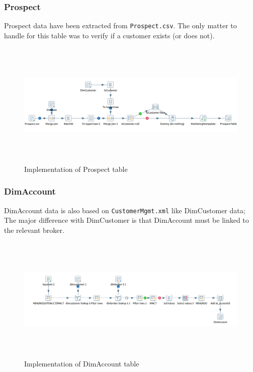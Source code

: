 \documentclass{article}
\newcommand\pcw[1]{\texttt{#1}}
\begin{document}
\subsubsection{Prospect}
Prospect data have been extracted from \pcw{Prospect.csv}. The only matter to handle for this table was to verify if a customer exists (or does not). 
\begin{figure}[H] 
\begin{center}
\includegraphics[width=15cm, height=6cm]{images2/Prospect.png}
\end{center}
\caption{Implementation of Prospect table}
\label{DimCus}
\end{figure} 

\subsubsection{DimAccount}
DimAccount data is also based on \pcw{CustomerMgmt.xml} like DimCustomer data; The major difference with DimCustomer is that DimAccount must be linked to the relevant broker.
\begin{figure}[H] 
\begin{center}
\includegraphics[width=15cm, height=6cm]{images2/DimAcc.png}
\end{center}
\caption{Implementation of DimAccount table}
\label{DimAcc}
\end{figure} 
\end{document}
